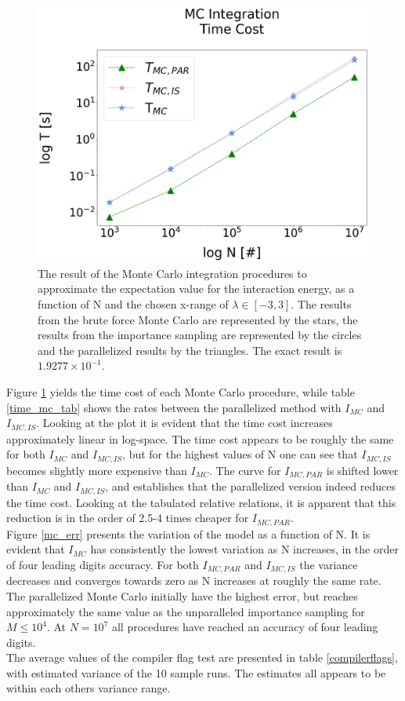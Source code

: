\documentclass[%
reprint,nofootinbib,
amsmath,amssymb,
aps,
]{revtex4-1}
\begin{document}
\begin{figure}[H]
	\vspace{35mm}
\includegraphics[width=\columnwidth]{MC_time.png}
\caption{\label{mc_time} The result of the Monte Carlo integration procedures to approximate the expectation value for the interaction energy, as a function of N and the chosen x-range of $\lambda \in[-3,3]$. The results from the brute force Monte Carlo are represented by the stars, the results from the importance sampling are represented by the circles and the parallelized results by the triangles. The exact result is $1.9277\times 10^{-1}$. }
\end{figure} \newpage \noindent 
Figure \ref{mc_time} yields the time cost of each Monte Carlo procedure, while table \ref{time_mc_tab} shows the rates between the parallelized method with $I_{MC}$ and $I_{MC,IS}$. Looking at the plot it is evident that the time cost increases approximately linear in log-space. The time cost appears to be roughly the same for both $I_{MC}$ and $I_{MC,IS}$, but for the highest values of N one can see that $I_{MC,IS}$ becomes slightly more expensive than $I_{MC}$. The curve for $I_{MC,PAR}$ is shifted lower than $I_{MC}$ and $I_{MC,IS}$, and establishes that the parallelized version indeed reduces the time cost. Looking at the tabulated relative relations, it is apparent that this reduction is in the order of 2.5-4 times cheaper for $I_{MC,PAR}$. \\
Figure \ref{mc_err} presents the variation of the model as a function of N. It is evident that $I_{MC}$ has consistently the lowest variation as N increases, in the order of four leading digits accuracy. For both $I_{MC,PAR}$ and $I_{MC,IS}$ the variance decreases and converges towards zero as N increases at roughly the same rate. The parallelized Monte Carlo initially have the highest error, but reaches approximately the same value as the unparalleled importance sampling for $M \leq 10^4$. At $N=10^7$ all procedures have reached an accuracy of four leading digits. \\ \indent
The average values of the compiler flag test are presented in table \ref{compilerflags}, with estimated variance of the 10 sample runs. The estimates all appears to be within each others variance range. \\
\end{document}
